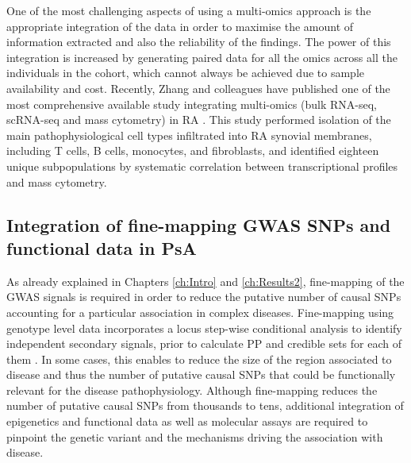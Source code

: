 

One of the most challenging aspects of using a multi-omics approach is the appropriate integration of the data in order to maximise the amount of information extracted and also the reliability of the findings. The power of this integration is increased by generating paired data for all the omics across all the individuals in the cohort, which cannot always be achieved due to sample availability and cost. Recently, Zhang and colleagues have published one of the most comprehensive available study integrating multi-omics (bulk RNA-seq, scRNA-seq and mass cytometry) in RA \parencite{Zhang2018}. This study performed isolation of the main pathophysiological cell types infiltrated into RA synovial membranes, including T cells, B cells, monocytes, and fibroblasts, and identified eighteen unique subpopulations by systematic correlation between transcriptional profiles and mass cytometry.



\subsection{Integration of fine-mapping GWAS SNPs and functional data in PsA}

As already explained in Chapters \ref{ch:Intro} and \ref{ch:Results2}, fine-mapping of the GWAS signals is required in order to reduce the putative number of causal SNPs accounting for a particular association in complex diseases. Fine-mapping using genotype level data incorporates a locus step-wise conditional analysis to identify independent secondary signals, prior to calculate PP and credible sets for each of them \parencite{Maller2012,Bunts2015}. In some cases, this enables to reduce the size of the region associated to disease and thus the number of putative causal SNPs that could be functionally relevant for the disease pathophysiology. Although fine-mapping reduces the number of putative causal SNPs from thousands to tens, additional integration of epigenetics and functional data as well as molecular assays are required to pinpoint the genetic variant and the mechanisms driving the association with disease.  


